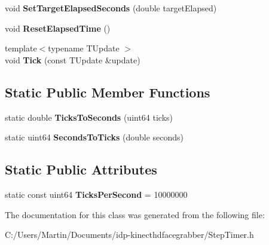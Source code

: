\begin{DoxyCompactItemize}
\item 
\hypertarget{class_d_x_1_1_step_timer_a7487a7841823805904a548e3fa37cef2}{}void {\bfseries Set\+Target\+Elapsed\+Seconds} (double target\+Elapsed)\label{class_d_x_1_1_step_timer_a7487a7841823805904a548e3fa37cef2}

\item 
\hypertarget{class_d_x_1_1_step_timer_ab07d4b15dec4b2ef390a359aeaad24fd}{}void {\bfseries Reset\+Elapsed\+Time} ()\label{class_d_x_1_1_step_timer_ab07d4b15dec4b2ef390a359aeaad24fd}

\item 
\hypertarget{class_d_x_1_1_step_timer_a758b88f80e00fabee7167885476681ee}{}{\footnotesize template$<$typename T\+Update $>$ }\\void {\bfseries Tick} (const T\+Update \&update)\label{class_d_x_1_1_step_timer_a758b88f80e00fabee7167885476681ee}

\end{DoxyCompactItemize}
\subsection*{Static Public Member Functions}
\begin{DoxyCompactItemize}
\item 
\hypertarget{class_d_x_1_1_step_timer_a59a20b9b3294d930299991c62703b0d0}{}static double {\bfseries Ticks\+To\+Seconds} (uint64 ticks)\label{class_d_x_1_1_step_timer_a59a20b9b3294d930299991c62703b0d0}

\item 
\hypertarget{class_d_x_1_1_step_timer_af6a26dd87202d9eeb167cc0b6e3c1a56}{}static uint64 {\bfseries Seconds\+To\+Ticks} (double seconds)\label{class_d_x_1_1_step_timer_af6a26dd87202d9eeb167cc0b6e3c1a56}

\end{DoxyCompactItemize}
\subsection*{Static Public Attributes}
\begin{DoxyCompactItemize}
\item 
\hypertarget{class_d_x_1_1_step_timer_aa671440c6c8008bd407ae889f5fb9f87}{}static const uint64 {\bfseries Ticks\+Per\+Second} = 10000000\label{class_d_x_1_1_step_timer_aa671440c6c8008bd407ae889f5fb9f87}

\end{DoxyCompactItemize}


The documentation for this class was generated from the following file\+:\begin{DoxyCompactItemize}
\item 
C\+:/\+Users/\+Martin/\+Documents/idp-\/kinecthdfacegrabber/Step\+Timer.\+h\end{DoxyCompactItemize}
